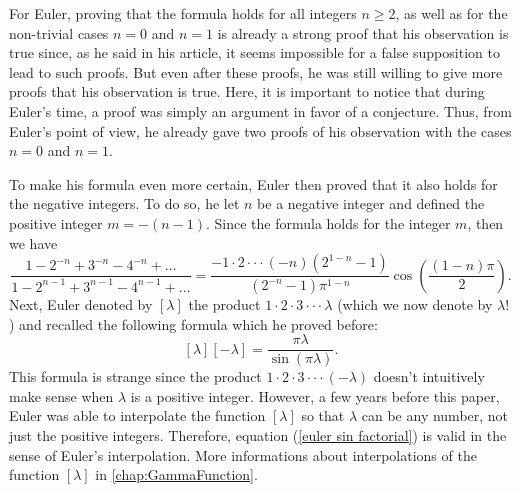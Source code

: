 For Euler, proving that the formula holds for all integers $n \geq 2$, as well as for the non-trivial cases $n = 0$ and $n = 1$ is already a strong proof that his observation is true since, as he said in his article, it seems impossible for a false supposition to lead to such proofs. But even after these proofs, he was still willing to give more proofs that his observation is true. Here, it is important to notice that during Euler's time, a proof was simply an argument in favor of a conjecture. Thus, from Euler's point of view, he already gave two proofs of his observation with the cases $n = 0$ and $n = 1$.

To make his formula even more certain, Euler then proved that it also holds for the negative integers. To do so, he let $n$ be a negative integer and defined the positive integer $m = -(n - 1)$. Since the formula holds for the integer $m$, then we have
$$\frac{1 - 2^{-n} + 3^{-n} - 4^{-n}+ ...}{\displaystyle 1 - 2^{n-1} +  3^{n-1} - 4^{n-1}  + ...} = \frac{-1\cdot 2 \cdot \cdot \cdot (-n)(2^{1-n} - 1)}{(2^{-n} - 1)\pi^{1-n}}\cos \left(\frac{(1-n) \pi }{2}\right).$$
Next, Euler denoted by $[\lambda]$ the product $1 \cdot 2 \cdot 3 \cdot \cdot \cdot \lambda$ (which we now denote by $\lambda !$) and recalled the following formula which he proved before:
\begin{equation} \label{euler sin factorial}
    [\lambda][-\lambda] = \frac{\pi \lambda}{\sin(\pi \lambda)}.
\end{equation}
This formula is strange since the product $1 \cdot 2 \cdot 3 \cdot \cdot \cdot (-\lambda)$ doesn't intuitively make sense when $\lambda$ is a positive integer. However, a few years before this paper, Euler was able to interpolate the function $[\lambda]$ so that $\lambda$ can be any number, not just the positive integers. Therefore, equation (\ref{euler sin factorial}) is valid in the sense of Euler's interpolation. More informations about interpolations of the function $[\lambda]$ in \autoref{chap:GammaFunction}.

